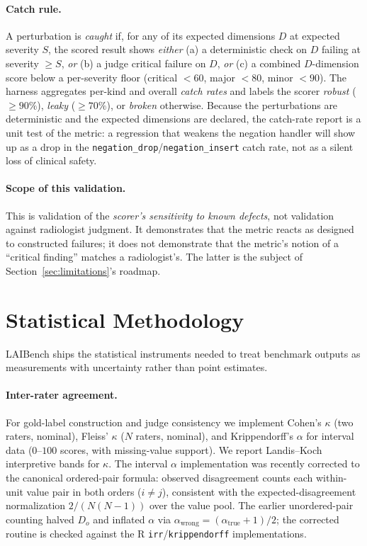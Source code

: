 \documentclass[11pt]{article}
\begin{document}
\paragraph{Catch rule.} A perturbation is \emph{caught} if, for any of its
expected dimensions $D$ at expected severity $S$, the scored result shows
\emph{either} (a) a deterministic check on $D$ failing at severity $\ge S$,
\emph{or} (b) a judge critical failure on $D$, \emph{or} (c) a combined
$D$-dimension score below a per-severity floor (critical $<60$, major $<80$,
minor $<90$). The harness aggregates per-kind and overall \emph{catch rates} and
labels the scorer \emph{robust} ($\ge90\%$), \emph{leaky} ($\ge70\%$), or
\emph{broken} otherwise. Because the perturbations are deterministic and the
expected dimensions are declared, the catch-rate report is a unit test of the
metric: a regression that weakens the negation handler will show up as a drop in
the \texttt{negation\_drop}/\texttt{negation\_insert} catch rate, not as a silent
loss of clinical safety.

\paragraph{Scope of this validation.} This is validation of the \emph{scorer's
sensitivity to known defects}, not validation against radiologist judgment. It
demonstrates that the metric reacts as designed to constructed failures; it does
not demonstrate that the metric's notion of a ``critical finding'' matches a
radiologist's. The latter is the subject of Section~\ref{sec:limitations}'s
roadmap.

\section{Statistical Methodology}
\label{sec:stats}

LAIBench ships the statistical instruments needed to treat benchmark outputs as
measurements with uncertainty rather than point estimates.

\paragraph{Inter-rater agreement.} For gold-label construction and judge
consistency we implement Cohen's $\kappa$ \cite{Cohen1960Kappa} (two raters,
nominal), Fleiss' $\kappa$ \cite{Fleiss1971Kappa} ($N$ raters, nominal), and
Krippendorff's $\alpha$ \cite{HayesKrippendorff2007,Krippendorff2018} for
interval data ($0$--$100$ scores, with missing-value support). We report
Landis--Koch \cite{LandisKoch1977} interpretive bands for $\kappa$. The interval
$\alpha$ implementation was recently corrected to the canonical ordered-pair
formula: observed disagreement counts each within-unit value pair in both orders
($i\neq j$), consistent with the expected-disagreement normalization
$2/(N(N-1))$ over the value pool. The earlier unordered-pair counting halved
$D_o$ and inflated $\alpha$ via $\alpha_{\text{wrong}}=(\alpha_{\text{true}}+1)/2$;
the corrected routine is checked against the R \texttt{irr}/\texttt{krippendorff}
implementations.
\end{document}
